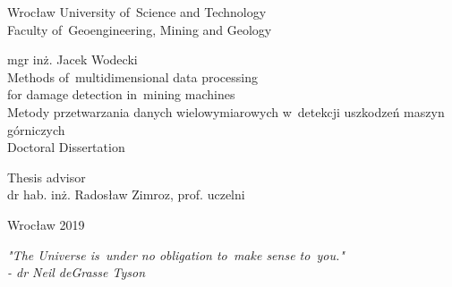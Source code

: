 \documentclass[a4paper,onecolumn,twoside,12pt]{mwrep}
\begin{document}
\theoremstyle{plain}
\newtheorem{defn}{Definition}[chapter]
\newtheorem{prop}{Property}[chapter]
\newtheorem{exmp}{Example}[section]

\begin{titlepage}
	\begin{center}
	\fontsize{20pt}{34pt}\selectfont
	Wrocław University of~Science and Technology \\
	\vspace*{.6\baselineskip}
	\fontsize{20pt}{18pt}\selectfont
	Faculty of~Geoengineering, Mining and Geology

	\vspace*{4\baselineskip}
	
	\fontsize{20pt}{15pt}\selectfont
	mgr inż. Jacek Wodecki\\%
	\vspace*{3.15\baselineskip}
	\fontsize{20pt}{18pt}\selectfont
	Methods of~multidimensional data processing \\for damage detection in~mining machines \\
		\vspace*{1.15\baselineskip}
	\fontsize{20pt}{18pt}\selectfont
  Metody przetwarzania danych wielowymiarowych w~detekcji uszkodzeń maszyn górniczych \\
	\vspace*{2.15\baselineskip}
	\fontsize{20pt}{20pt}\selectfont
	Doctoral Dissertation \\
	
	\end{center}
	\vspace*{3.15\baselineskip}
		\begin{flushright}
	\fontsize{16pt}{16pt}\selectfont
Thesis advisor\\
	dr hab. inż. Radosław Zimroz, prof. uczelni\\
	\end{flushright}
		\vspace*{1\baselineskip}
		\begin{center}
	\fontsize{14pt}{1pt}\selectfont
	Wrocław 2019
  \end{center}
  

\cleardoublepage
\thispagestyle{empty}
\end{titlepage}


\begin{flushright}


\textit{"The Universe is~under no obligation to~make sense to~you."\\
- dr Neil deGrasse Tyson}
\end{flushright}
\end{document}

